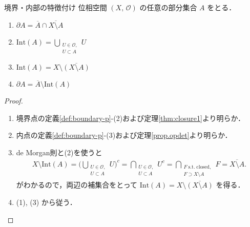 \documentclass[geometry_main]{subfiles}
\begin{document}
\begin{mytheo}[label=thm:boundary]{境界・内部の特徴付け}
	位相空間 $(X,\, \mathscr{O})$ の任意の部分集合 $A$ をとる．
	\begin{enumerate}
		\item $\partial A = \overline{A} \cap \overline{X \setminus A}$
		\item $\displaystyle\mathrm{Int}(A) = \bigcup_{\substack{U \in \mathscr{O}, \\ U \subset A}} U$
		\item $\mathrm{Int}(A) = X \setminus \overline{(X \setminus A)}$
		\item $\partial A = \overline{A} \setminus \mathrm{Int}(A)$
	\end{enumerate}
\end{mytheo}

\begin{proof}
	\begin{enumerate}
		\item 境界点の定義\ref{def:boundary-p}-(2)および定理\ref{thm:closure1}より明らか．
		\item 内点の定義\ref{def:boundary-p}-(3)および定理\ref{prop.opdet}より明らか．
		\item de Morgan則と(2)を使うと
		\begin{align}
			X \setminus \mathrm{Int}(A) = \Biggl(\bigcup_{\substack{U \in \mathscr{O}, \\ U \subset A}} U\Biggr)^c = \bigcap_{\substack{U \in \mathscr{O}, \\ U \subset A}} U^c = \bigcap_{\substack{F\; \mathrm{s.t.}\;\mathrm{closed}, \\ F \supset X \setminus A}} F = \overline{X \setminus A}.
		\end{align}
		がわかるので，両辺の補集合をとって $\mathrm{Int}(A) = X \setminus \overline{(X \setminus A)}$ を得る．
		\item (1), (3) から従う．
	\end{enumerate}
\end{proof}
\end{document}
